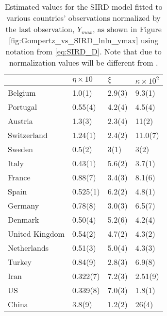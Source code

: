 \documentclass{article}
\begin{document}
\begin{table}[H]
\centering
\caption{Estimated values for the SIRD model fitted to various countries' observations normalized by the last observation, $Y_{max}$, as shown in Figure \ref{fig:Gompertz_vs_SIRD_lnln_ymax} using notation from \ref{eq:SIRD_D}. Note that due to normalization values will be different from \citet{carletti2020covid}.}
\begin{tabular}{llll}
\toprule
{} &           $\eta\times 10$ &      $\xi$ &            $\kappa\times 10^{2}$ \\
\midrule
Belgium        &    1.0(1) &  2.9(3) &   9.3(1) \\
Portugal       &   0.55(4) &  4.2(4) &   4.5(4) \\
Austria        &    1.3(3) &  2.3(4) &    11(2) \\
Switzerland    &   1.24(1) &  2.4(2) &  11.0(7) \\
Sweden         &    0.5(2) &    3(1) &     3(2) \\
Italy          &   0.43(1) &  5.6(2) &   3.7(1) \\
France         &   0.88(7) &  3.4(3) &   8.1(6) \\
Spain          &  0.525(1) &  6.2(2) &   4.8(1) \\
Germany        &   0.78(8) &  3.0(3) &   6.5(7) \\
Denmark        &   0.50(4) &  5.2(6) &   4.2(4) \\
United Kingdom &   0.54(2) &  4.7(2) &   4.3(2) \\
Netherlands    &   0.51(3) &  5.0(4) &   4.3(3) \\
Turkey         &   0.84(9) &  2.8(3) &   6.9(8) \\
Iran           &  0.322(7) &  7.2(3) &  2.51(9) \\
US             &  0.339(8) &  7.0(3) &   1.8(1) \\
China          &    3.8(9) &  1.2(2) &    26(4) \\
\bottomrule
\end{tabular}

\end{table}
\end{document}
